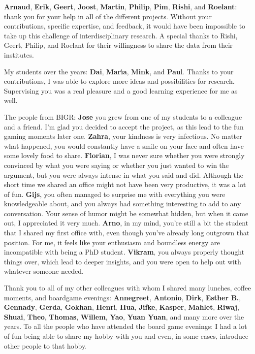 \textbf{Arnaud}, \textbf{Erik}, \textbf{Geert}, \textbf{Joost}, \textbf{Martin}, \textbf{Philip}, \textbf{Pim}, \textbf{Rishi}, and \textbf{Roelant}: thank you for your help in all of the different projects.
Without your contributions, specific expertise, and feedback, it would have been impossible to take up this challenge of interdisciplinary research.
A special thanks to Rishi, Geert, Philip, and Roelant for their willingness to share the data from their institutes.

My students over the years: \textbf{Dai}, \textbf{Mar{\'\i}a}, \textbf{Mink}, and \textbf{Paul}.
Thanks to your contributions, I was able to explore more ideas and possibilities for research.
Supervising you was a real pleasure and a good learning experience for me as well.

The people from BIGR:
\textbf{Jose} you grew from one of my students to a colleague and a friend.
I'm glad you decided to accept the project, as this lead to the fun gaming moments later one.
\textbf{Zahra}, your kindness is very infectious.
No matter what happened, you would constantly have a smile on your face and often have some lovely food to share.
\textbf{Florian}, I was never sure whether you were strongly convinced by what you were saying or whether you just wanted to win the argument, but you were always intense in what you said and did.
Although the short time we shared an office might not have been very productive, it was a lot of fun.
\textbf{Gijs}, you often managed to surprise me with everything you were knowledgeable about, and you always had something interesting to add to any conversation.
Your sense of humor might be somewhat hidden, but when it came out, I appreciated it very much.
\textbf{Arno}, in my mind, you're still a bit the student that I shared my first office with, even though you've already long outgrown that position.
For me, it feels like your enthusiasm and boundless energy are incompatible with being a PhD student.
\textbf{Vikram}, you always properly thought things over, which lead to deeper insights, and you were open to help out with whatever someone needed.

Thank you to all of my other colleagues with whom I shared many lunches, coffee moments, and boardgame evenings:
\textbf{Annegreet}, \textbf{Antonio}, \textbf{Dirk}, \textbf{Esther B.}, \textbf{Gennady}, \textbf{Gerda}, \textbf{Gokhan}, \textbf{Henri}, \textbf{Hua}, \textbf{Jifke}, \textbf{Kasper}, \textbf{Mahlet}, \textbf{Riwaj}, \textbf{Shuai}, \textbf{Theo}, \textbf{Thomas}, \textbf{Willem}, \textbf{Yao}, \textbf{Yuan Yuan}, and many more over the years.
To all the people who have attended the board game evenings: I had a lot of fun being able to share my hobby with you and even, in some cases, introduce other people to that hobby.

